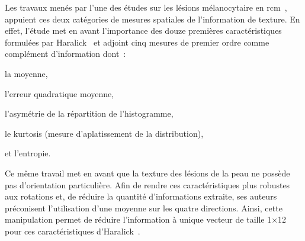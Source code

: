Les travaux menés par l'une des études sur les lésions mélanocytaire en \gls{rcm}~\cite{Wiltgen2008}, appuient ces deux catégories de mesures spatiales de l'information de texture. En effet, l'étude met en avant l'importance des douze premières caractéristiques formulées par Haralick~\cite{Haralick1973} et adjoint cinq mesures de premier ordre comme complément d'information dont~:
\begin{inlinerate}
    \item la moyenne,
    \item l'erreur quadratique moyenne,
    \item l'asymétrie de la répartition de l'histogramme,
    \item le kurtosis (mesure d'aplatissement de la distribution),
    \item et l'entropie.
\end{inlinerate}
Ce même travail met en avant que la texture des lésions de la peau ne possède pas d'orientation particulière. Afin de rendre ces caractéristiques plus robustes aux rotations et, de réduire la quantité d'informations extraite, ses auteurs préconisent l'utilisation d'une moyenne sur les quatre directions. Ainsi, cette manipulation permet de réduire l'information à unique vecteur de taille 1$\times$12 pour ces caractéristiques d'Haralick~\cite{Wiltgen2008}.\par

